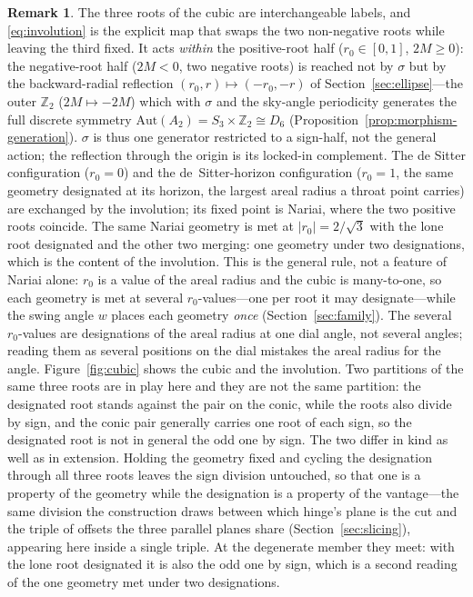 \documentclass[11pt,a4paper]{article}
\theoremstyle{definition}
\newtheorem{remark}[theorem]{Remark}
\begin{document}
\begin{remark}
The three roots of the cubic are interchangeable labels, and \eqref{eq:involution} is the explicit map that swaps the two non-negative roots while leaving the third fixed. It acts \emph{within} the positive-root half ($r_{0}\in[0,1]$, $2M\ge0$): the negative-root half ($2M<0$, two negative roots) is reached not by $\sigma$ but by the backward-radial reflection $(r_{0},r)\mapsto(-r_{0},-r)$ of Section~\ref{sec:ellipse}---the outer $\mathbb{Z}_{2}$ ($2M\mapsto-2M$) which with $\sigma$ and the sky-angle periodicity generates the full discrete symmetry $\mathrm{Aut}(A_{2})=S_{3}\times\mathbb{Z}_{2}\cong D_{6}$ (Proposition~\ref{prop:morphism-generation}). $\sigma$ is thus one generator restricted to a sign-half, not the general action; the reflection through the origin is its locked-in complement. The de Sitter configuration ($r_{0}=0$) and the de~Sitter-horizon configuration ($r_{0}=1$, the same geometry designated at its horizon, the largest areal radius a throat point carries) are exchanged by the involution; its fixed point is Nariai, where the two positive roots coincide. The same Nariai geometry is met at $|r_{0}|=2/\sqrt3$ with the lone root designated and the other two merging: one geometry under two designations, which is the content of the involution. This is the general rule, not a feature of Nariai alone: $r_{0}$ is a value of the areal radius and the cubic is many-to-one, so each geometry is met at several $r_{0}$-values---one per root it may designate---while the swing angle $w$ places each geometry \emph{once} (Section~\ref{sec:family}). The several $r_{0}$-values are designations of the areal radius at one dial angle, not several angles; reading them as several positions on the dial mistakes the areal radius for the angle. Figure~\ref{fig:cubic} shows the cubic and the involution. Two partitions of the same three roots are in play here and they are not the same partition: the designated root stands against the pair on the conic, while the roots also divide by sign, and the conic pair generally carries one root of each sign, so the designated root is not in general the odd one by sign. The two differ in kind as well as in extension. Holding the geometry fixed and cycling the designation through all three roots leaves the sign division untouched, so that one is a property of the geometry while the designation is a property of the vantage---the same division the construction draws between which hinge's plane is the cut and the triple of offsets the three parallel planes share (Section~\ref{sec:slicing}), appearing here inside a single triple. At the degenerate member they meet: with the lone root designated it is also the odd one by sign, which is a second reading of the one geometry met under two designations.
\end{remark}
\end{document}
